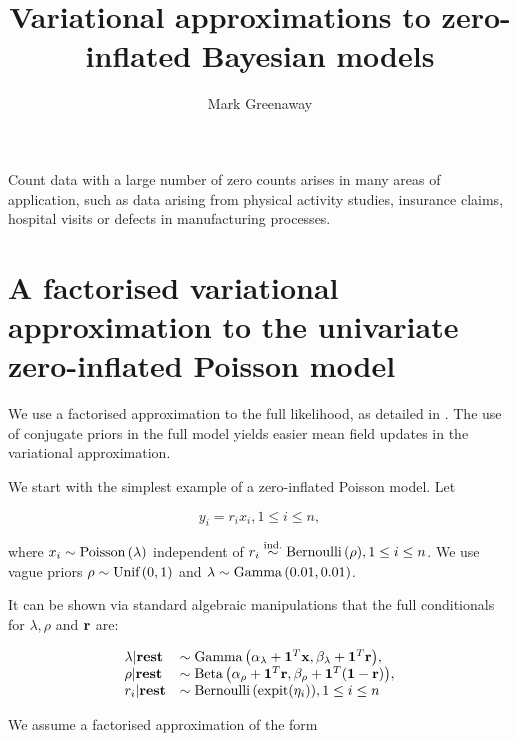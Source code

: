 \documentclass{amsart}
\title{Variational approximations to zero-inflated Bayesian models}
\author{Mark Greenaway}
\begin{document}
\maketitle
\noindent Count data with a large number of zero counts arises in many areas of
application, such as data arising from physical activity studies, 
insurance claims, hospital visits or defects in manufacturing processes.

\section{A factorised variational approximation to the univariate zero-inflated Poisson model}


\noindent We use a factorised approximation to the full likelihood, as detailed in \cite{ormerod10}.
The use of conjugate priors in the full model yields easier mean field updates in the
variational approximation.

\noindent We start with the simplest example of a zero-inflated Poisson model. Let

$$
y_i = r_i x_i, 1 \leq i \leq n,
$$

\noindent where $x_i \sim {\text{Poisson} \left( \lambda \right)}$ independent of $r_i \stackrel{\text{ind.}}{\sim} {\text{Bernoulli} \left( \rho \right)}, 1 \leq i \leq n$. We use vague priors
$\rho \sim {\text{Unif} \left( 0, 1 \right)}$ and $\lambda \sim {\text{Gamma} \left( 0.01, 0.01 \right)}$. 

\noindent It can be shown via standard algebraic manipulations that the
full conditionals for $\lambda, \rho$ and ${\bf r}$ are:

$$
\begin{array}{ll}
\lambda | \textbf{rest} &\sim {\text{Gamma} \left( \alpha_\lambda + {\bf1}^T{\bf x}, \beta_\lambda + {\bf1}^T{\bf r}\right)}, \\
\rho | \textbf{rest} &\sim {\text{Beta} \left( \alpha_\rho + {\bf1}^T {\bf r}, \beta_\rho + {\bf1}^T({\bf1}- {\bf r}) \right)}, \\
r_i | \textbf{rest} &\sim {\text{Bernoulli} \left( \text{expit}(\eta_i) \right)}, 1 \leq i \leq n
\end{array}
$$


\noindent We assume a factorised approximation of the form
\end{document}
